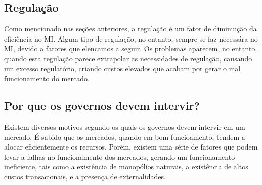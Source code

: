 \documentclass[
	12pt,				%
	oneside,			%
	a4paper,			%
	chapter=TITLE,		%
	section=TITLE,		%
	english,			%
	brazil				%
	]{abntex2}
\begin{document}
\begin{refsection}
{\section{Regulação}\label{regulauxe7uxe3o}}

Como mencionado nas seções anteriores, a regulação é um fator de diminuição da
eficiência no \gls{MI}. Algum tipo de regulação, no entanto, sempre se faz
necessára no \gls{MI}, devido a fatores que elencamos a seguir. Os problemas
aparecem, no entanto, quando esta regulação parece extrapolar as necessidades
de regulação, causando um excesso regulatório, criando custos elevados que
acabam por gerar o mal funcionamento do mercado.

\hypertarget{por-que-os-governos-devem-intervir}{%
\subsection{Por que os governos devem intervir?}\label{por-que-os-governos-devem-intervir}}

Existem diversos motivos segundo os quais os governos devem intervir em um
mercado. É sabido que os mercados, quando em bom funcioamento, tendem a alocar
eficientemente os recursos. Porém, existem uma série de fatores que podem levar
a falhas no funcionamento dos mercados, gerando um funcionamento ineficiente,
tais como a existência de monopólios naturais, a existência de altos custos
transacionais, e a presença de externalidades.


\end{refsection}
\end{document}
